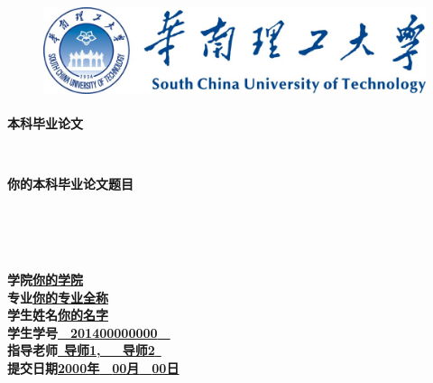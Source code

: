 \documentclass[a4paper]{article}
\begin{document}
\thispagestyle{empty}
\begin{figure}[ht]
\centering
\includegraphics[height=2.75cm]{title.png}
\end{figure}
\begin{center}
\textbf{本科毕业论文}
\end{center}
\nopagebreak[4]
\begin{center}
\ \\
\end{center}
\nopagebreak[4]
\begin{center}
\textbf{你的本科毕业论文题目}
\end{center}
\nopagebreak[4]
\begin{center}
\ \\\ \\\ \\
\end{center}
\nopagebreak[4]
\begin{spacing}{1.8}
\begin{center}
\textbf{学\quad\quad 院}\quad\underline{\quad\quad\quad\quad\textbf{你的学院}\quad\quad\quad\quad}\\
\textbf{专\quad\quad 业}\quad\underline{\quad\quad\quad\textbf{你的专业全称}\quad\quad\quad}\\
\textbf{学生姓名}\quad\underline{\quad\quad\quad\quad\textbf{你的名字}\quad\quad\quad\quad}\\
\textbf{学生学号}\quad\underline{\quad\quad\ \ \textbf{201400000000}\ \ \quad\quad}\\
\textbf{指导老师}\quad\underline{\quad\quad\ \textbf{导师1,\ \ \ 导师2}\ \quad\quad}\\
\textbf{提交日期}\quad\underline{\quad\textbf{2000年}\ \ \textbf{00月}\ \ \textbf{00日}\quad}
\end{center}
\end{spacing}
\pagebreak[4]
\end{document}
